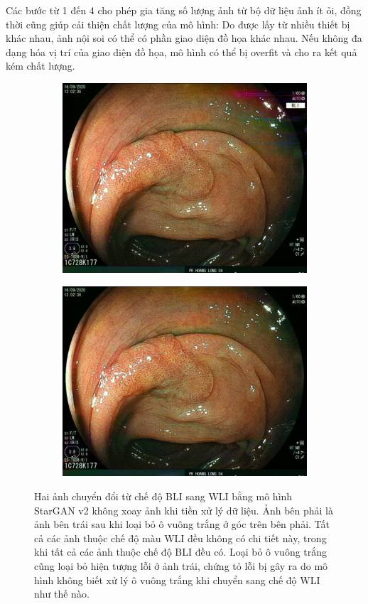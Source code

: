 \documentclass[12pt]{extreport}
\begin{document}
Các bước từ 1 đến 4 cho phép gia tăng số lượng ảnh từ bộ dữ liệu ảnh ít ỏi, đồng thời cũng giúp cải thiện chất lượng của mô hình: Do được lấy từ nhiều thiết bị khác nhau, ảnh nội soi có thể có phần giao diện đồ họa khác nhau. Nếu không đa dạng hóa vị trí của giao diện đồ họa, mô hình có thể bị overfit và cho ra kết quả kém chất lượng.

\begin{figure}[H]
    \centering
    \begin{subfigure}[H]{0.48\textwidth}
        \centering
        \includegraphics[width=\linewidth]{figure38.jpeg}
    \end{subfigure}
    \begin{subfigure}[H]{0.48\textwidth}
        \centering
        \includegraphics[width=\linewidth]{figure39.jpeg}
    \end{subfigure}
    \caption{Hai ảnh chuyển đổi từ chế độ BLI sang WLI bằng mô hình StarGAN v2 không xoay ảnh khi tiền xử lý dữ liệu. Ảnh bên phải là ảnh bên trái sau khi loại bỏ ô vuông trắng ở góc trên bên phải. Tất cả các ảnh thuộc chế độ màu WLI đều không có chi tiết này, trong khi tất cả các ảnh thuộc chế độ BLI đều có. Loại bỏ ô vuông trắng cũng loại bỏ hiện tượng lỗi ở ảnh trái, chứng tỏ lỗi bị gây ra do mô hình không biết xử lý ô vuông trắng khi chuyển sang chế độ WLI như thế nào.}
\end{figure}
\end{document}

